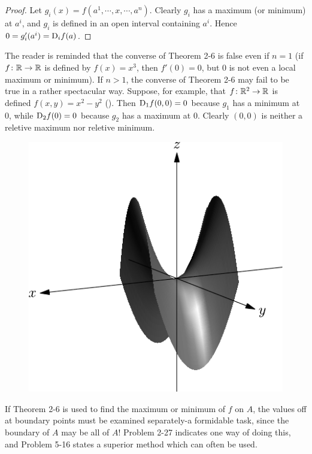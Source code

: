 \begin{proof}
  Let $g_i(x) = f(a^1, \cdots, x, \cdots, a^n)$. Clearly $g_i$ has a maximum (or minimum)
  at $a^i$, and $g_i$ is defined in an open interval containing 
  $a^i$. Hence $0 = g_i'(a^i) = \mathrm{D}_if(a)$.
\end{proof}

The reader is reminded that the converse of Theorem 2-6
is false even if $n=1$ (if $f\colon{}\mathbb{R}\to \mathbb{R}$ is defined by $f(x) = x^3$, then $f'(0) = 0$, but 
0 is not even a local maximum or minimum). If $n>1$, the converse of Theorem 2-6 may fail 
to be true in a rather spectacular way. Suppose, for example, that $f\colon{}\mathbb{R}^2\to \mathbb{R}$ is defined 
$f(x, y) = x^2-y^2$ (). Then $\mathrm{D}_1f(0, 0) = 0$ because $g_1$ 
has a minimum at 0, while $\mathrm{D}_2f(0) = 0$ because $g_2$ has a maximum at 0. 
Clearly $(0, 0)$ is neither a reletive maximum nor reletive minimum.

\begin{figure}[!htb]
  \centering
  \includegraphics[width=.75\linewidth]{./pics/Fig2-2.pdf}
  \caption{}
  \label{Fig 2-2}
\end{figure}

If Theorem 2-6 is used to find the maximum or minimum of
$f$ on $A$, the values off at boundary points must be examined
separately-a formidable task, since the boundary of $A$ may
be all of $A$! Problem 2-27 indicates one way of doing this,
and Problem 5-16 states a superior method which can often
be used.

